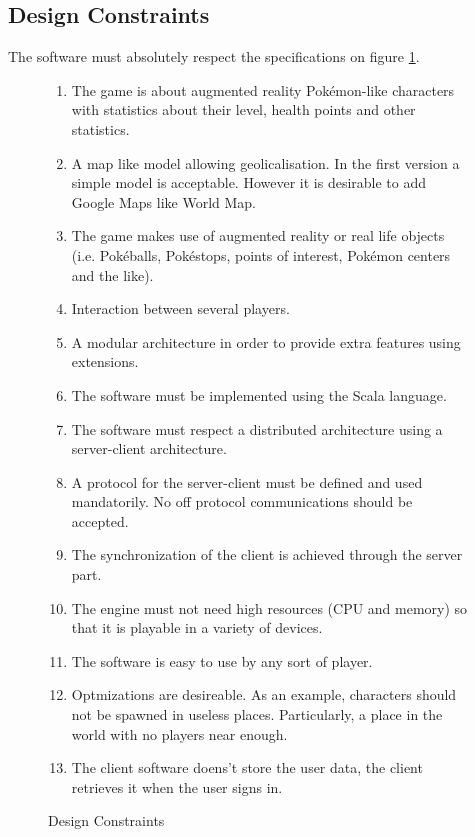 \documentclass[a4paper,09pt]{article}
\begin{document}
\subsection{Design Constraints}
The software must absolutely respect the specifications on figure \ref{descons}.
\begin{figure}[!h]
  \begin{center}
    \begin{enumerate}
    \item The game is about augmented reality Pokémon-like characters
      with statistics about their level, health points and other statistics.
    \item A map like model allowing geolicalisation. In the first version
      a simple model is acceptable. However it is desirable to add Google
      Maps like World Map.
    \item The game makes use of augmented reality or real life objects
      (i.e. Pokéballs, Pokéstops, points of interest, Pokémon centers and
      the like).
    \item Interaction between several players.
    \item A modular architecture in order to provide extra features
      using extensions.
    \item The software must be implemented using the Scala language.
    \item The software must respect a distributed architecture using a
      server-client architecture.
    \item A protocol for the server-client must be defined and used mandatorily.
      No off protocol communications should be accepted.
    \item The synchronization of the client is achieved through the server part.
    \item The engine must not need high resources (CPU and memory) so that it
      is playable in a variety of devices.
    \item The software is easy to use by any sort of player.
    \item Optmizations are desireable. As an example, characters should not
      be spawned in useless places. Particularly, a place in the world with
      no players near enough.
    \item The client software doens't store the user data, the client
      retrieves it when the user signs in.
    \end{enumerate}
    \caption{Design Constraints}
    \label{descons}
  \end{center}
\end{figure}
\end{document}
